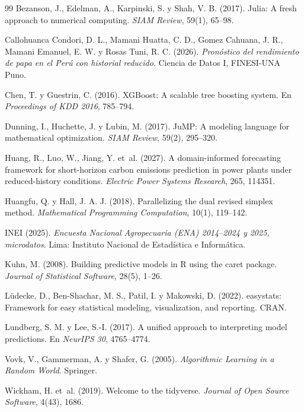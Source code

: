 \documentclass[letterpaper]{report}
\begin{document}
\begin{article}
\begin{thebibliography}{99}
 Bezanson, J., Edelman, A., Karpinski, S. y Shah, V. B. (2017). Julia: A fresh approach to numerical computing. \emph{SIAM Review}, 59(1), 65--98.

 Callohuanca Condori, D. L., Mamani Huatta, C. D., Gomez Cahuana, J. R., Mamani Emanuel, E. W. y Rosas Tuni, R. C. (2026). \emph{Pronóstico del rendimiento de papa en el Perú con historial reducido}. Ciencia de Datos I, FINESI-UNA Puno.

 Chen, T. y Guestrin, C. (2016). XGBoost: A scalable tree boosting system. En \emph{Proceedings of KDD 2016}, 785--794.

 Dunning, I., Huchette, J. y Lubin, M. (2017). JuMP: A modeling language for mathematical optimization. \emph{SIAM Review}, 59(2), 295--320.

 Huang, R., Luo, W., Jiang, Y. et~al. (2027). A domain-informed forecasting framework for short-horizon carbon emissions prediction in power plants under reduced-history conditions. \emph{Electric Power Systems Research}, 265, 114351.

 Huangfu, Q. y Hall, J. A. J. (2018). Parallelizing the dual revised simplex method. \emph{Mathematical Programming Computation}, 10(1), 119--142.

 INEI (2025). \emph{Encuesta Nacional Agropecuaria (ENA) 2014--2024 y 2025, microdatos}. Lima: Instituto Nacional de Estadística e Informática.

 Kuhn, M. (2008). Building predictive models in R using the caret package. \emph{Journal of Statistical Software}, 28(5), 1--26.

 Lüdecke, D., Ben-Shachar, M. S., Patil, I. y Makowski, D. (2022). easystats: Framework for easy statistical modeling, visualization, and reporting. CRAN.

 Lundberg, S. M. y Lee, S.-I. (2017). A unified approach to interpreting model predictions. En \emph{NeurIPS 30}, 4765--4774.

 Vovk, V., Gammerman, A. y Shafer, G. (2005). \emph{Algorithmic Learning in a Random World}. Springer.

 Wickham, H. et~al. (2019). Welcome to the tidyverse. \emph{Journal of Open Source Software}, 4(43), 1686.
\end{thebibliography}

\par\address{Rodrigo Claudio Rosas Tuni\\ Facultad de Ingeniería Estadística e Informática (FINESI)\\ Universidad Nacional del Altiplano, Puno, Perú}
\end{article}
\end{document}
